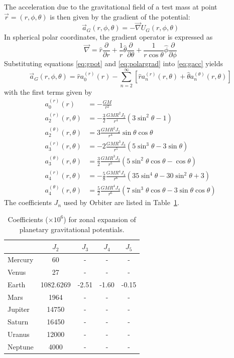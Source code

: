 \documentclass[a4paper]{article}
\begin{document}
The acceleration due to the gravitational field of a test mass at point $\vec{r} = (r,\phi,\theta)$ is then given by the gradient of the potential:
\begin{equation}\label{eq:gacc}
\vec{a}_G(r,\phi,\theta) = -\vec{\nabla} U_G(r,\phi,\theta)
\end{equation}
In spherical polar coordinates, the gradient operator is expressed as
\begin{equation}\label{eq:polargrad}
\vec{\nabla} = \hat{r} \frac{\partial}{\partial r} + \frac{1}{r} \hat{\theta}\frac{\partial}{\partial \theta} + \frac{1}{r \cos\theta}\hat{\phi}\frac{\partial}{\partial\phi}
\end{equation}
Substituting equations \ref{eq:gpot} and \ref{eq:polargrad} into \ref{eq:gacc} yields
\begin{equation}
\vec{a}_G(r,\phi,\theta) = \hat{r} a_0^{(r)}(r) - \sum_{n=2}^\infty \left[ \hat{r} a_n^{(r)}(r,\theta) + \hat{\theta} a_n^{(\theta)}(r,\theta) \right]
\end{equation}
with the first terms given by
\begin{equation}
\begin{split}
a_0^{(r)}(r) &= -\frac{GM}{r^2} \\
a_2^{(r)}(r,\theta) &= -\frac{3}{2} \frac{GMR^2 J_2}{r^4}(3\sin^2\theta - 1)\\
a_2^{(\theta)}(r,\theta) &= 3 \frac{GMR^2 J_2}{r^4} \sin\theta \cos\theta \\
a_3^{(r)}(r,\theta) &= -2 \frac{GMR^3 J_3}{r^5}(5 \sin^3\theta - 3\sin\theta)\\
a_3^{(\theta)}(r,\theta) &= \frac{3}{2} \frac{GMR^3 J_3}{r^5} (5 \sin^2\theta \cos\theta - \cos\theta) \\
a_4^{(r)}(r,\theta) &= -\frac{5}{8} \frac{GMR^4 J_4}{r^6}(35 \sin^4\theta - 30\sin^2\theta + 3) \\
a_4^{(\theta)}(r,\theta) &= \frac{5}{2} \frac{GMR^4 J_4}{r^6} (7 \sin^3\theta \cos\theta - 3 \sin\theta \cos\theta)
\end{split}
\end{equation}
The coefficients $J_n$ used by Orbiter are listed in Table~\ref{tab:Jn}.
\begin{table}
\begin{tabular}{lcccc}
        & $J_2$     & $J_3$ & $J_4$ & $J_5$ \\ \hline
Mercury & 60        & -     & -     & -     \\
Venus   & 27        & -     & -     & -     \\ 
Earth   & 1082.6269 & -2.51 & -1.60 & -0.15 \\
Mars    & 1964      & -     & -     & -     \\
Jupiter & 14750     & -     & -     & -     \\
Saturn  & 16450     & -     & -     & -     \\
Uranus  & 12000     & -     & -     & -     \\
Neptune & 4000      & -     & -     & -
\end{tabular}
\caption{Coefficients ($\times 10^6$) for zonal expansion of planetary gravitational potentials.}
\label{tab:Jn}
\end{table}
\end{document}

